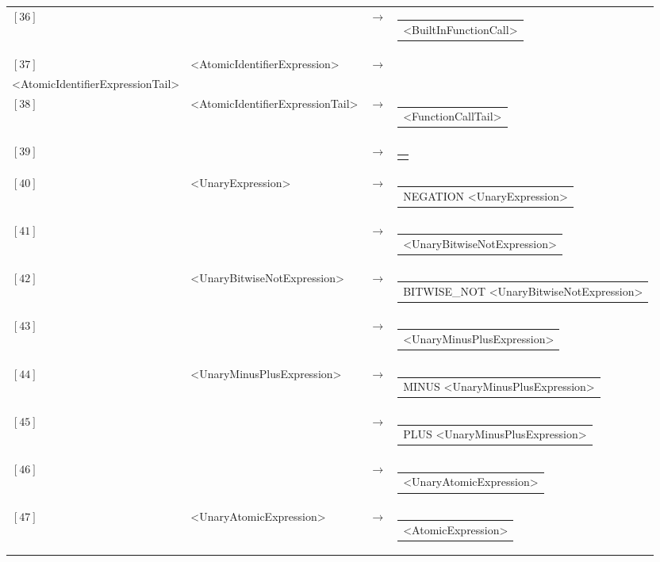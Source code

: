 \documentclass[a4paper,10pt]{article}
\begin{document}
\begin{longtable}{llll}
$[36]$&&$\rightarrow$&\begin{tabular}[t]{@{}l@{}}<BuiltInFunctionCall> \end{tabular}\\
$[37]$&<AtomicIdentifierExpression>&$\rightarrow$&\begin{tabular}[t]{@{}l@{}}IDENTIFIER \\<AtomicIdentifierExpressionTail> \end{tabular}\\
$[38]$&<AtomicIdentifierExpressionTail>&$\rightarrow$&\begin{tabular}[t]{@{}l@{}}<FunctionCallTail> \end{tabular}\\
$[39]$&&$\rightarrow$&\begin{tabular}[t]{@{}l@{}}$\epsilon$ \end{tabular}\\
$[40]$&<UnaryExpression>&$\rightarrow$&\begin{tabular}[t]{@{}l@{}}NEGATION <UnaryExpression> \end{tabular}\\
$[41]$&&$\rightarrow$&\begin{tabular}[t]{@{}l@{}}<UnaryBitwiseNotExpression> \end{tabular}\\
$[42]$&<UnaryBitwiseNotExpression>&$\rightarrow$&\begin{tabular}[t]{@{}l@{}}BITWISE\_NOT <UnaryBitwiseNotExpression> \end{tabular}\\
$[43]$&&$\rightarrow$&\begin{tabular}[t]{@{}l@{}}<UnaryMinusPlusExpression> \end{tabular}\\
$[44]$&<UnaryMinusPlusExpression>&$\rightarrow$&\begin{tabular}[t]{@{}l@{}}MINUS <UnaryMinusPlusExpression> \end{tabular}\\
$[45]$&&$\rightarrow$&\begin{tabular}[t]{@{}l@{}}PLUS <UnaryMinusPlusExpression> \end{tabular}\\
$[46]$&&$\rightarrow$&\begin{tabular}[t]{@{}l@{}}<UnaryAtomicExpression> \end{tabular}\\
$[47]$&<UnaryAtomicExpression>&$\rightarrow$&\begin{tabular}[t]{@{}l@{}}<AtomicExpression> \end{tabular}\\

\end{longtable}
\end{document}
